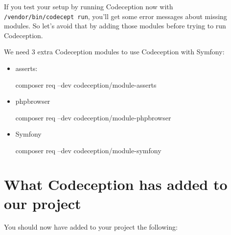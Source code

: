 \documentclass[a4paperpaper,openright]{book}
\newenvironment{Shaded}{}{}
\newcommand{\ExtensionTok}[1]{#1}
\newcommand{\NormalTok}[1]{#1}
\begin{document}
If you test your setup by running Codeception now with
\texttt{/vendor/bin/codecept\ run}, you'll get some error messages about
missing modules. So let's avoid that by adding those modules before
trying to run Codeception.

We need 3 extra Codeception modules to use Codeception with Symfony:

\begin{itemize}
\item
  asserts:

\begin{Shaded}
\begin{Highlighting}[]
\ExtensionTok{composer}\NormalTok{ req --dev codeception/module-asserts }
\end{Highlighting}
\end{Shaded}
\item
  phpbrowser

\begin{Shaded}
\begin{Highlighting}[]
\ExtensionTok{composer}\NormalTok{ req --dev codeception/module-phpbrowser}
\end{Highlighting}
\end{Shaded}
\item
  Symfony

\begin{Shaded}
\begin{Highlighting}[]
\ExtensionTok{composer}\NormalTok{ req --dev codeception/module-symfony}
\end{Highlighting}
\end{Shaded}
\end{itemize}

\hypertarget{what-codeception-has-added-to-our-project}{%
\section{What Codeception has added to our
project}\label{what-codeception-has-added-to-our-project}}

You should now have added to your project the following:
\end{document}
